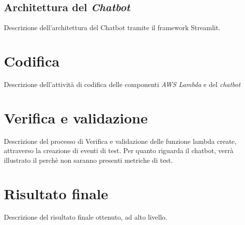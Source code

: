 \subsection{Architettura del \textit{Chatbot}}
Descrizione dell'architettura del Chatbot tramite il framework Streamlit.
\section{Codifica}
Descrizione dell'attività di codifica delle componenti \textit{AWS Lambda} e del \textit{chatbot}
\section{Verifica e validazione}
Descrizione del processo di Verifica e validazione delle funzione lambda create, attraverso la creazione di eventi di test.
Per quanto riguarda il chatbot, verrà illustrato il perchè non saranno presenti metriche di test.

\section{Risultato finale}
Descrizione del risultato finale ottenuto, ad alto livello.